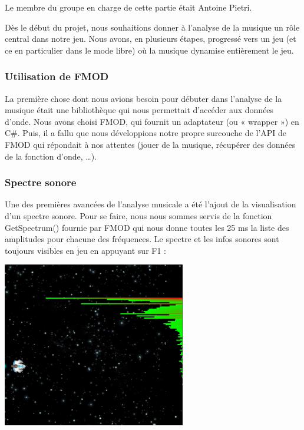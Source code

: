 \par Le membre du groupe en charge de cette partie était Antoine Pietri.
\vspace{1cm}
\par Dès le début du projet, nous souhaitions donner à l'analyse de la musique un rôle central dans notre jeu.
Nous avons, en plusieurs étapes, progressé vers un jeu (et ce en particulier dans le mode libre) où la musique
dynamise entièrement le jeu.

\subsubsection{Utilisation de FMOD}

La première chose dont nous avions besoin pour débuter dans l'analyse de la musique était une bibliothèque
qui nous permettait d'accéder aux données d'onde. Nous avons choisi FMOD, qui fournit un adaptateur (ou « wrapper ») en C\#. Puis, il a fallu que nous développions notre propre surcouche de l'API de FMOD qui répondait à nos attentes
(jouer de la musique, récupérer des données de la fonction d'onde, \ldots).

\subsubsection{Spectre sonore}

Une des premières avancées de l'analyse musicale a été l'ajout de la visualisation d'un spectre sonore.
Pour se faire, nous nous sommes servis de la fonction GetSpectrum() fournie par FMOD qui nous donne toutes les
25 ms la liste des amplitudes pour chacune des fréquences.
Le spectre et les infos sonores sont toujours visibles en jeu en appuyant sur F1 :

\begin{center}
	\includegraphics[width=8cm]{images/spectre.png}
\end{center}

